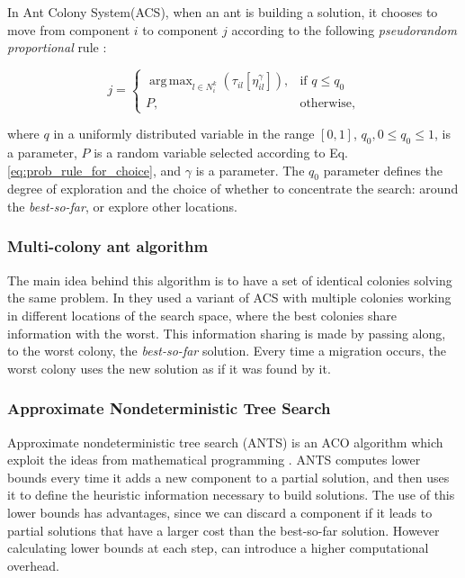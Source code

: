 					In Ant Colony System(ACS), when an ant is building a solution, it chooses to move from component $i$ to component $j$ according to the following \emph{pseudorandom proportional} rule \cite{dorigo97}:

					\begin{equation} 
						\label{eq:acs_choice_rule}
						j =
						  \begin{cases}
						   \operatorname{arg\,\max}_{l \in N_{i}^k} (\tau_{il}[\eta_{il}^{\gamma}]), & \text{if } q \leq q_{0}  \\
						  	P, & \text{otherwise,}
						  \end{cases}
					\end{equation}

					\noindent where $q$ in a uniformly distributed variable in the range $[0,1]$, $q_{0}, 0 \leq q_{0} \leq 1$, is a parameter, $P$ is a random variable selected according to Eq. \eqref{eq:prob_rule_for_choice}, and $\gamma$ is a parameter. The $q_{0}$ parameter defines the degree of exploration and the choice of whether to concentrate the search: around the \emph{best-so-far}, or explore other locations.

					\subsubsection*{Multi-colony ant algorithm}
					The main idea behind this algorithm is to have a set of identical colonies solving the same problem. In \cite{melo10} they used a variant of ACS with multiple colonies working in different locations of the search space, where the best colonies share information with the worst. This information sharing is made by passing along, to the worst colony, the \emph{best-so-far} solution. Every time a migration occurs, the worst colony uses the new solution as if it was found by it.


					\subsubsection*{Approximate Nondeterministic Tree Search}
					Approximate nondeterministic tree search (ANTS) is an ACO algorithm which exploit the ideas from mathematical programming \cite{Maniezzo99}. ANTS computes lower bounds every time it adds a new component to a partial solution, and then uses it to define the heuristic information necessary to build solutions. The use of this lower bounds has advantages, since we can discard a component if it leads to partial solutions that have a larger cost than the best-so-far solution. However calculating lower bounds at each step, can introduce a higher computational overhead.


